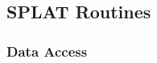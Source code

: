 \documentclass[letterpaper,10pt,english]{sphinxmanual}
\begin{document}
\begin{fulllineitems}
\begin{fulllineitems}
\begin{quote}
\begin{description}
\end{description}\end{quote}

\end{fulllineitems}


\end{fulllineitems}



\subsection{SPLAT Routines}
\label{api:splat-routines}

\subsubsection{Data Access}
\label{api:data-access}
\end{document}
